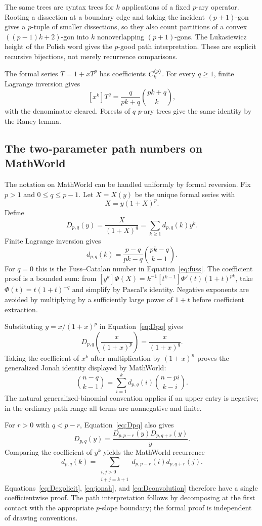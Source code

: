 The same trees are syntax trees for $k$ applications of a fixed $p$-ary
operator.  Rooting a dissection at a boundary edge and taking the incident
$(p+1)$-gon gives a $p$-tuple of smaller dissections, so they also count
partitions of a convex $((p-1)k+2)$-gon into $k$ nonoverlapping
$(p+1)$-gons.  The Lukasiewicz height of the Polish word gives the $p$-good
path interpretation.  These are explicit recursive bijections, not merely
recurrence comparisons.

The formal series $T=1+xT^p$ has coefficients $C^{(p)}_k$.  For every $q\ge1$, finite Lagrange inversion gives
\[
 [x^k]T^q=\frac{q}{pk+q}\binom{pk+q}{k},                         \tag{7.6}\label{eq:fuss-power}
\]
with the denominator cleared.  Forests of $q$ $p$-ary trees give the same
identity by the Raney lemma.

\subsection{The two-parameter path numbers on MathWorld}

The notation on MathWorld can be handled uniformly by formal reversion.  Fix
$p>1$ and $0\le q\le p-1$.  Let $X=X(y)$ be the unique formal series with
\[
 X=y(1+X)^p.                                                      \tag{7.7}\label{eq:Xreversion}
\]
Define
\[
 D_{p,q}(y)=\frac{X}{(1+X)^q}=\sum_{k\ge1}d_{p,q}(k)y^k.          \tag{7.8}\label{eq:Dpq}
\]
Finite Lagrange inversion gives
\[
 d_{p,q}(k)=\frac{p-q}{pk-q}\binom{pk-q}{k-1}.                  \tag{7.9}\label{eq:Dexplicit}
\]
For $q=0$ this is the Fuss--Catalan number in
Equation~\eqref{eq:fuss}.  The coefficient proof is a bounded sum: from
\([y^k]\Phi(X)=k^{-1}[t^{k-1}]\Phi'(t)(1+t)^{pk}\), take
$\Phi(t)=t(1+t)^{-q}$ and simplify by Pascal's identity.  Negative exponents
are avoided by multiplying by a sufficiently large power of $1+t$ before
coefficient extraction.

Substituting $y=x/(1+x)^p$ in Equation~\eqref{eq:Dpq} gives
\[
 D_{p,q}\left(\frac{x}{(1+x)^p}\right)=\frac{x}{(1+x)^q}.        \tag{7.10}\label{eq:Dsub}
\]
Taking the coefficient of $x^k$ after multiplication by $(1+x)^n$ proves the
generalized Jonah identity displayed by MathWorld:
\[
 \binom{n-q}{k-1}
 =\sum_{i=1}^{k}d_{p,q}(i)\binom{n-pi}{k-i}.                    \tag{7.11}\label{eq:jonah}
\]
The natural generalized-binomial convention applies if an upper entry is
negative; in the ordinary path range all terms are nonnegative and finite.

For $r>0$ with $q<p-r$, Equation~\eqref{eq:Dpq} also gives
\[
 D_{p,q}(y)=\frac{D_{p,p-r}(y)D_{p,q+r}(y)}{y}.                  \tag{7.12}
\]
Comparing the coefficient of $y^k$ yields the MathWorld recurrence
\[
 d_{p,q}(k)=
 \sum_{\substack{i,j>0\\i+j=k+1}}
 d_{p,p-r}(i)d_{p,q+r}(j).                                      \tag{7.13}\label{eq:Dconvolution}
\]
Equations~\eqref{eq:Dexplicit}, \eqref{eq:jonah}, and
\eqref{eq:Dconvolution} therefore have a single coefficientwise \ipra{} proof.
The path interpretation follows by decomposing at the first contact with the
appropriate $p$-slope boundary; the formal proof is independent of drawing
conventions.

